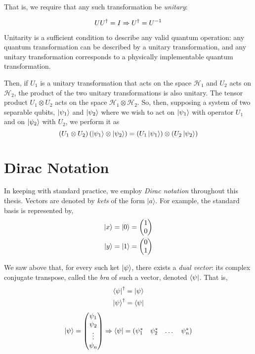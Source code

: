 That is, we require that any such transformation be \emph{unitary}:

\begin{equation}  \label{unitary condition}
UU^{\dag} = I \\
\Rightarrow U^{\dag} = U^{-1}
\end{equation}

Unitarity is a sufficient condition to describe any valid quantum operation: any quantum transformation can be described by a unitary transformation, 
    and any unitary transformation corresponds to a physically implementable quantum transformation. %

Then, if $U_1$ is a unitary transformation that acts on the space $\mathcal{H}_1$ and $U_2$ acts on $\mathcal{H}_2$, the product of the two unitary transformations is also unitary. 
The tensor product $U_1 \otimes U_2$ acts on the space $\mathcal{H}_1 \otimes \mathcal{H}_2$. 
So, then, supposing a system of two separable qubits, $\ket{\psi_1} $ and $\ket{\psi_2} $ where we wish to act on $\ket{\psi_1} $ with operator $U_1$ and on $\ket{\psi_2} $ with $U_2$, 
    we perform it as
\begin{equation}
    \left( U_1 \otimes U_2 \right) \left(\ket{\psi_1} \otimes \ket{\psi_2} \right) = \left(U_1\ket{\psi_1}\right) \otimes \left(U_2 \ket{\psi_2}\right)
\end{equation}

\section{Dirac Notation}\label{sec:dirac_notation}
In keeping with standard practice, we employ \emph{Dirac notation} throughout this thesis. 
Vectors are denoted by \emph{kets} of the form $|a\rangle$. 
For example, the standard basis is represented by, 
\begin{equation}
    \begin{split}
    \ket{x} =  \ket{0} &= \left(\begin{matrix}1\\0\end{matrix}\right) 
    \\ \ket{y} = \ket{1} &= \left(\begin{matrix}0\\1\end{matrix}\right)
    \end{split}
\end{equation}
 
We saw above that, for every such ket $\ket{\psi}$, there exists a \textit{dual vector}: 
    its complex conjugate transpose, called the \emph{bra} of such a vector, denoted $\bra{\psi}$. 
That is,
\begin{equation}
    \begin{split}
        \bra{\psi}^{\dag} &= \ket{\psi} 
        \\ \ket{\psi} ^{\dag} &= \bra{\psi}
    \end{split}
\end{equation}
\begin{equation}
    \ket{\psi} = \left(\begin{matrix}\psi_1 \\ \psi_2 \\ \vdots \\ \psi_n\end{matrix}\right) 
    \Rightarrow \bra{\psi}  = \begin{matrix}(\psi_1^{*} & \psi_2^{*} & \dots & \psi_n^{*})\end{matrix} 
\end{equation}

